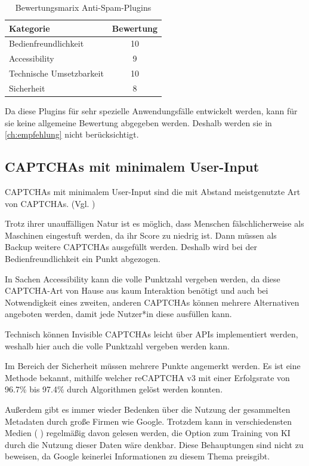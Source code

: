 \begin{table}[h!]
    \caption{Bewertungsmarix Anti-Spam-Plugins}
    \begin{center}
        \begin{tabular}{l|c}
            Kategorie                       & Bewertung \\\hline
            Bedienfreundlichkeit            & 10         \\
            Accessibility                   & 9        \\
            Technische Umsetzbarkeit        & 10         \\
            Sicherheit                      & 8         
        \end{tabular}
    \end{center}
\end{table} 

Da diese Plugins für sehr spezielle Anwendungsfälle entwickelt werden,
kann für sie keine allgemeine Bewertung abgegeben werden.
Deshalb werden sie in \autoref{ch:empfehlung} nicht berücksichtigt.

\subsection{CAPTCHAs mit minimalem User-Input}
CAPTCHAs mit minimalem User-Input sind die mit Abstand meistgenutzte Art von CAPTCHAs. (Vgl. \cite{stats})

Trotz ihrer unauffälligen Natur ist es möglich, dass Menschen fälschlicherweise als Maschinen eingestuft werden,
da ihr Score zu niedrig ist. 
Dann müssen als Backup weitere CAPTCHAs ausgefüllt werden.
Deshalb wird bei der Bedienfreundlichkeit ein Punkt abgezogen.

In Sachen Accessibility kann die volle Punktzahl vergeben werden,
da diese CAPTCHA-Art von Hause aus kaum Interaktion benötigt und auch bei Notwendigkeit eines zweiten, anderen CAPTCHAs
können mehrere Alternativen angeboten werden, damit jede Nutzer*in diese ausfüllen kann.

Technisch können Invisible CAPTCHAs leicht über APIs implementiert werden, weshalb hier auch die volle Punktzahl vergeben werden kann.

Im Bereich der Sicherheit müssen mehrere Punkte angemerkt werden.
Es ist eine Methode bekannt, mithilfe welcher reCAPTCHA v3 mit einer Erfolgsrate von 96.7\% bis 97.4\% durch Algorithmen gelöst werden konnten.
\cite{DBLP:journals/corr/abs-1903-01003}

Außerdem gibt es immer wieder Bedenken über die Nutzung der gesammelten Metadaten durch große Firmen wie Google.
Trotzdem kann in verschiedensten Medien (\cite{sueddt} \cite{hackernoon} \cite{towardsdatascience}) regelmäßig davon gelesen werden,
die Option zum Training von KI durch die Nutzung dieser Daten wäre denkbar.
Diese Behauptungen sind nicht zu beweisen, da Google keinerlei Informationen zu diesem Thema preisgibt.

